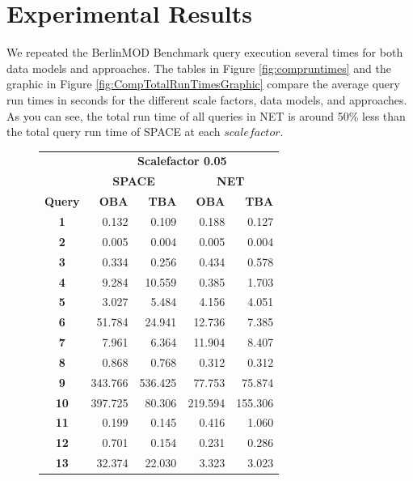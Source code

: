 \documentclass[a4paper]{article}
\newcommand{\bmodb} {BerlinMOD Benchmark}
\begin{document}
\section{Experimental Results}
\label{sec:results}
We repeated the \bmodb{} query execution several times for both data models and
approaches. The tables in Figure \ref{fig:compruntimes} and the graphic in Figure
\ref{fig:CompTotalRunTimesGraphic} compare the average query run times in seconds
for the different scale factors, data models, and approaches.
As you can see, the total run time of all queries in NET is around
50\% less than the total query run time of SPACE at each $scalefactor$.
\begin{figure}[h]
  \begin{minipage}{0.5\linewidth}
    \begin{tiny}
      \begin{tabular}{|c|r|r|r|r|}
        \hline
        &\multicolumn{4}{c|}{\textbf{Scalefactor 0.05}}\\
        \cline{2-5}
        &\multicolumn{2}{c|}{\textbf{SPACE}}&\multicolumn{2}{c|}{\textbf{NET}}\\
        \hline
        \textbf{Query}&\textbf{OBA}&\textbf{TBA}&\textbf{OBA}&\textbf{TBA}\\
        \hline
        \textbf{1}&0.132&0.109&0.188&0.127\\
        \hline
        \textbf{2}&0.005&0.004&0.005&0.004\\
        \hline
        \textbf{3}&0.334&0.256&0.434&0.578\\
        \hline
        \textbf{4}&9.284&10.559&0.385&1.703\\
        \hline
        \textbf{5}&3.027&5.484&4.156&4.051\\
        \hline
        \textbf{6}&51.784&24.941&12.736&7.385\\
        \hline
        \textbf{7}&7.961&6.364&11.904&8.407\\
        \hline
        \textbf{8}&0.868&0.768&0.312&0.312\\
        \hline
        \textbf{9}&343.766&536.425&77.753&75.874\\
        \hline
        \textbf{10}&397.725&80.306&219.594&155.306\\
        \hline
        \textbf{11}&0.199&0.145&0.416&1.060\\
        \hline
        \textbf{12}&0.701&0.154&0.231&0.286\\
        \hline
        \textbf{13}&32.374&22.030&3.323&3.023\\

\end{tabular}
\end{tiny}
\end{minipage}
\end{figure}
\end{document}
